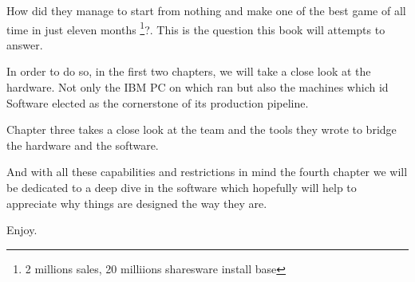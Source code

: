\par
 How did they manage to start from nothing and make one of the best game of all time in just eleven months \footnote{2 millions sales, 20 milliions sharesware install base}?. This is the question this book will attempts to answer.\\
 \par
  In order to do so, in the first two chapters, we will take a close look at the hardware. Not only the IBM PC on which \doom ran but also the \NeXT machines which id Software elected as the cornerstone of its production pipeline.\\
  \par 
  Chapter three takes a close look at the team and the tools they wrote to bridge the hardware and the software.\\
  \par
  And with all these capabilities and restrictions in mind the fourth chapter we will be dedicated to a deep dive in the software which hopefully will help to appreciate why things are designed the way they are.\\
\par
Enjoy.

\begin{figure}[H]
\centering
{}
\end{figure}
\par
\begin{figure}[H]
\centering
{}
\end{figure}
